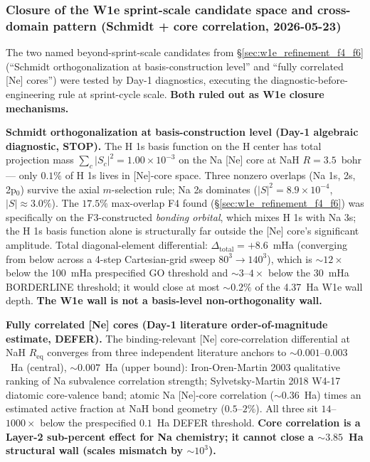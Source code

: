 \documentclass[aps,pra,twocolumn,superscriptaddress,longbibliography]{revtex4-2}
\begin{document}
\subsubsection{Closure of the W1e sprint-scale candidate space and cross-domain pattern (Schmidt + core correlation, 2026-05-23)}
\label{sec:w1e_schmidt_core_correlation}

The two named beyond-sprint-scale candidates from \S\ref{sec:w1e_refinement_f4_f6}
(``Schmidt orthogonalization at basis-construction level'' and
``fully correlated [Ne] cores'') were tested by Day-1 diagnostics,
executing the diagnostic-before-engineering rule at sprint-cycle scale.
\textbf{Both ruled out as W1e closure mechanisms.}

\textbf{Schmidt orthogonalization at basis-construction level
(Day-1 algebraic diagnostic, STOP).} The H 1s basis function on the
H center has total projection mass
$\sum_c |S_c|^2 = 1.00 \times 10^{-3}$ on the Na [Ne] core at
NaH $R = 3.5$~bohr --- only $0.1\%$ of H 1s lives in [Ne]-core
space. Three nonzero overlaps (Na 1s, 2s, 2p$_0$) survive the
axial $m$-selection rule; Na 2s dominates
($|S|^2 = 8.9 \times 10^{-4}$, $|S| \approx 3.0\%$). The
$17.5\%$ max-overlap F4 found
(\S\ref{sec:w1e_refinement_f4_f6}) was specifically on the
F3-constructed \emph{bonding orbital}, which mixes H 1s with
Na 3s; the H 1s basis function alone is structurally far outside
the [Ne] core's significant amplitude. Total diagonal-element
differential: $\Delta_\text{total} = +8.6$~mHa (converging from
below across a 4-step Cartesian-grid sweep $80^3 \to 140^3$), which
is $\sim 12\times$ below the 100~mHa prespecified GO threshold
and $\sim 3$--$4\times$ below the 30~mHa BORDERLINE threshold;
it would close at most $\sim 0.2\%$ of the 4.37~Ha W1e wall depth.
\textbf{The W1e wall is not a basis-level non-orthogonality wall.}

\textbf{Fully correlated [Ne] cores (Day-1 literature
order-of-magnitude estimate, DEFER).} The binding-relevant
[Ne] core-correlation differential at NaH $R_\text{eq}$ converges
from three independent literature anchors to $\sim 0.001$--$0.003$~Ha
(central), $\sim 0.007$~Ha (upper bound): Iron-Oren-Martin 2003
qualitative ranking of Na subvalence correlation strength;
Sylvetsky-Martin 2018 W4-17 diatomic core-valence band; atomic
Na [Ne]-core correlation ($\sim 0.36$~Ha) times an estimated
active fraction at NaH bond geometry ($0.5$--$2\%$). All three
sit $14$--$1000\times$ below the prespecified $0.1$~Ha DEFER
threshold. \textbf{Core correlation is a Layer-2 sub-percent
effect for Na chemistry; it cannot close a $\sim 3.85$~Ha
structural wall (scales mismatch by $\sim 10^3$).}
\end{document}
